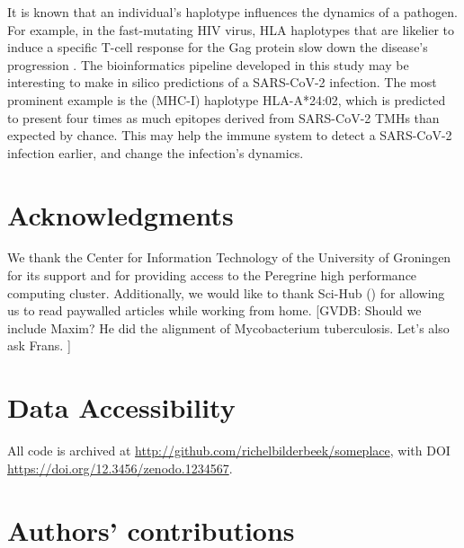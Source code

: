 
It is known that an individual's haplotype
influences the dynamics of a pathogen.
For example, in the fast-mutating HIV virus, 
HLA haplotypes that are likelier to induce a specific T-cell response
for the Gag protein slow down the disease's 
progression \cite{eccleston2017host}.
The bioinformatics pipeline developed in this
study may be interesting to make in silico
predictions of a SARS-CoV-2 infection.
The most prominent example is the (MHC-I)
haplotype HLA-A*24:02,
which is predicted to present four times as much epitopes derived 
from SARS-CoV-2 TMHs than expected by chance.
This may help the immune system to detect a SARS-CoV-2 infection earlier,
and change the infection's dynamics.

\section{Acknowledgments}

We thank the Center for Information Technology of the University 
of Groningen for its support and for providing access to the Peregrine 
high performance computing cluster. 
Additionally, we would like to thank Sci-Hub (\cite{himmelstein2018sci})
for allowing us to read paywalled articles while working from home.
[GVDB: 
  Should we include Maxim? 
  He did the alignment of Mycobacterium tuberculosis. 
  Let’s also ask Frans.
]

\section{Data Accessibility}

All code is archived at \url{http://github.com/richelbilderbeek/someplace},
with DOI \url{https://doi.org/12.3456/zenodo.1234567}.

\section{Authors' contributions}

